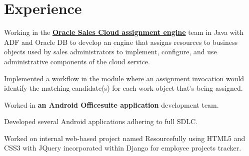 \documentclass[a4paper]{srika-resume} %
\begin{document}
\hfill
%
%
\begin{minipage}[t]{0.64\textwidth} %


\section{Experience}


\vspace{\topsep} %
\begin{tightitemize}
\item Working in the \textbf{\href{https://docs.oracle.com/cloud/latest/salescs_gs/OASAL/OASAL1439686.htm\#OASAL1439686}{Oracle Sales Cloud assignment engine}} team in Java with ADF and Oracle DB to develop an engine that assigns resources to business objects used by sales administrators to implement, configure, and use administrative components of the cloud service.
\item Implemented a workflow in the module where an assignment invocation would identify the matching candidate(s) for each work object that's being assigned.
\end{tightitemize}

\sectionspace %



\begin{tightitemize}
\item Worked in \textbf{an Android Officesuite application} development team.
\item Developed several Android applications adhering to full SDLC.
\item Worked on internal web-based project named Resourcefully using HTML5 and CSS3 with JQuery incorporated within Django for employee projects tracker.
\end{tightitemize}


\end{minipage}
\end{document}
